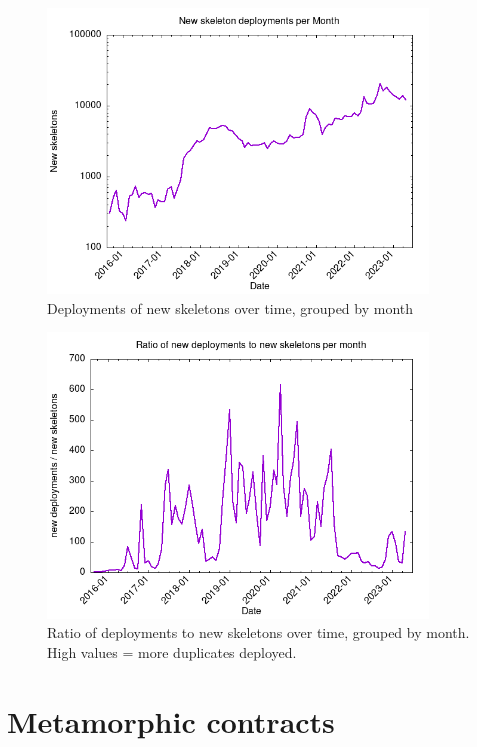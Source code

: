 \begin{figure}[H]
    \centering
    \includegraphics[width=0.9\textwidth]{Figures/analysis/skeletons_per_month.png}
    \caption{Deployments of new skeletons over time, grouped by month}
    \label{fig:skeletons-deploy}
\end{figure}

\begin{figure}[H]
    \centering
    \includegraphics[width=0.9\textwidth]{Figures/analysis/ratio_per_month.png}
    \caption{Ratio of deployments to new skeletons over time, grouped by month. High values = more duplicates deployed.}
    \label{fig:skeletons-ratio}
\end{figure}


\newpage

\section{Metamorphic contracts}

